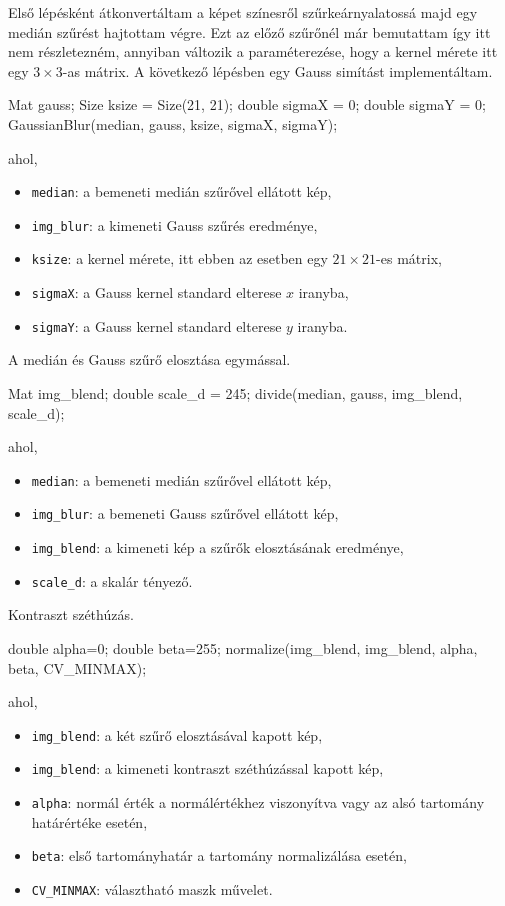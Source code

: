 Első lépésként átkonvertáltam a képet színesről szűrkeárnyalatossá majd egy medián szűrést hajtottam végre. Ezt az előző szűrőnél már bemutattam így itt nem részletezném, annyiban változik a paraméterezése, hogy a kernel mérete itt egy $3 \times 3$-as mátrix.
A következő lépésben egy Gauss simítást implementáltam. 
\begin{cpp}
Mat gauss;
Size ksize = Size(21, 21);
double sigmaX = 0;
double sigmaY = 0;
GaussianBlur(median, gauss, ksize, sigmaX, sigmaY);
\end{cpp}
ahol,
\begin{itemize}
    \item \texttt{median}: a bemeneti medián szűrővel ellátott kép,
    \item \texttt{img\_blur}: a kimeneti Gauss szűrés eredménye,
    \item \texttt{ksize}: a kernel mérete, itt ebben az esetben egy $21 \times 21$-es mátrix,
    \item \texttt{sigmaX}: a Gauss kernel standard elterese $x$ iranyba,
    \item \texttt{sigmaY}: a Gauss kernel standard elterese $y$ iranyba.
\end{itemize}
A medián és Gauss szűrő elosztása egymással.
\begin{cpp}
Mat img_blend;
double scale_d = 245;
divide(median, gauss, img_blend, scale_d);   
\end{cpp}
ahol,
\begin{itemize}
    \item \texttt{median}: a bemeneti medián szűrővel ellátott kép,
    \item \texttt{img\_blur}: a bemeneti Gauss szűrővel ellátott kép,
    \item \texttt{img\_blend}: a kimeneti kép a szűrők elosztásának eredménye,
    \item \texttt{scale\_d}: a skalár tényező.
\end{itemize}
Kontraszt széthúzás.
\begin{cpp}
double alpha=0; 
double beta=255;
normalize(img_blend, img_blend, alpha, beta, CV_MINMAX);
\end{cpp}
ahol,
\begin{itemize}
    \item \texttt{img\_blend}: a két szűrő elosztásával kapott kép,
    \item \texttt{img\_blend}: a kimeneti kontraszt széthúzással kapott kép,
    \item \texttt{alpha}: normál érték a normálértékhez viszonyítva vagy az alsó tartomány határértéke esetén,
    \item \texttt{beta}: első tartományhatár a tartomány normalizálása esetén,
    \item \texttt{CV\_MINMAX}: választható maszk művelet.
\end{itemize}

